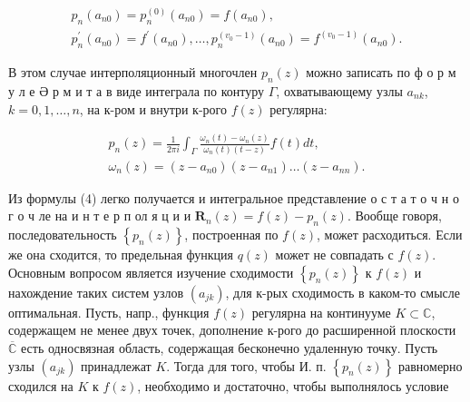 \documentclass[10pt]{article}
\begin{document}
\[

\begin{gathered}

p_{n}\left(a_{n 0}\right)=p_{n}^{(0)}\left(a_{n 0}\right)=f\left(a_{n 0}\right), \\

p_{n}^{\prime}\left(a_{n 0}\right)=f^{\prime}\left(a_{n 0}\right), \ldots, p_{n}^{\left(v_{0}-1\right)}\left(a_{n 0}\right)=f^{\left(v_{0}-1\right)}\left(a_{n 0}\right) .

\end{gathered}

\]



В этом случае интерполяционный многочлен $p_{n}(z)$ можно записать по ф о р м у л е Ә р м и т а в виде интеграла по контуру $\Gamma$, охватывающему узлы $a_{n k}$, $k=0,1, \ldots, n$, на к-ром и внутри к-рого $f(z)$ регулярна:



\[

\begin{gathered}

p_{n}(z)=\frac{1}{2 \pi i} \int_{\Gamma} \frac{\omega_{n}(t)-\omega_{n}(z)}{\omega_{n}(t)(t-z)} f(t) d t, \\

\omega_{n}(z)=\left(z-a_{n 0}\right)\left(z-a_{n 1}\right) \ldots\left(z-a_{n n}\right) .

\end{gathered}

\]



Из формулы (4) легко получается и интегральное представление о с т а т о ч н о г о ч ле на и н т е р п ол я ц и и $\boldsymbol{R}_{n}(z)=f(z)-p_{n}(z)$. Вообще говоря, последовательность $\left\{p_{n}(z)\right\}$, построенная по $f(z)$, может расходиться. Если же она сходится, то предельная функция $q(z)$ может не совпадать с $f(z)$. Основным вопросом является изучение сходимости $\left\{p_{n}(z)\right\}$ к $f(z)$ и нахождение таких систем узлов $\left(a_{j k}\right)$, для к-рых сходимость в каком-то смысле оптимальная. Пусть, напр., функция $f(z)$ регулярна на континууме $K \subset \mathbb{C}$, содержащем не менее двух точек, дополнение к-рого до расширенной плоскости $\overline{\mathbb{C}}$ есть односвязная область, содержащая бесконечно удаленную точку. Пусть узлы $\left(a_{j k}\right)$ принадлежат $K$. Тогда для того, чтобы И. п. $\left\{p_{n}(z)\right\}$ равномерно сходился на $K$ к $f(z)$, необходимо и достаточно, чтобы выполнялось условие
\end{document}
